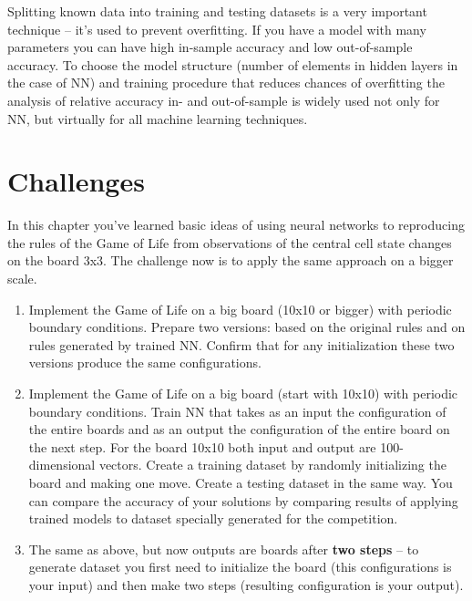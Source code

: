 Splitting known data into training and testing datasets is
a very important technique -- it's used to prevent overfitting.
If you have a model with many parameters you can have high
in-sample accuracy and low out-of-sample accuracy. 
To choose the model structure (number of elements in hidden
layers in the case of NN) and training procedure that reduces 
chances of overfitting the analysis of relative accuracy
in- and out-of-sample is widely used not only for NN, but
virtually for all machine learning techniques.

\section{Challenges}

In this chapter you've learned basic ideas of using neural networks
to reproducing the rules of the Game of Life from observations
of the central cell state changes on the board 3x3.
The challenge now is to apply the same approach on a bigger scale.

\begin{enumerate}
\item Implement the Game of Life on a big board (10x10 or bigger)
with periodic boundary conditions. Prepare two versions: based on 
the original rules and on rules generated by trained NN. Confirm that
for any initialization these two versions produce the same configurations.
\item Implement the Game of Life on a big board (start with 10x10)
with periodic boundary conditions. Train NN that takes as an input
the configuration of the entire boards and as an output the configuration
of the entire board on the next step. For the board 10x10 both input
and output are 100-dimensional vectors. Create a training dataset by
randomly initializing the board and making one move. Create a testing
dataset in the same way. You can compare the accuracy of your solutions 
by comparing results of applying trained models to dataset 
specially generated for the competition.
\item The same as above, but now outputs are boards after 
\textbf{two steps} --
to generate dataset you first need to initialize the board 
(this configurations is your input) and then make two steps 
(resulting configuration is your output).
\end{enumerate}
